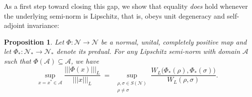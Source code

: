 \documentclass[11pt,reqno]{amsart}
\numberwithin{equation}{section}
\newtheorem{prop}[lemma]{Proposition}
\newcommand{\mc}{\mathcal}
\begin{document}
As a first step toward closing this gap, we show that equality \emph{does} hold whenever the underlying semi-norm is Lipschitz, that is, obeys unit degeneracy and self-adjoint invariance:
\begin{prop}\label{prop:duality}
  \label{thm:Lip=contr}
  Let $\Phi\!:\mc N \!\to\! \mc N$ be a normal, unital, completely positive map and let $\Phi_*:\mc N_*\!\to\! \mc N_*$ denote its predual. For any Lipschitz semi-norm with domain $\mc A$ such that  $\Phi(\mc A) \subseteq \mc A$, we have
  \[
      \sup_{x=x^{*}\in\mc A}\frac{|||\Phi(x)|||_{L}}{|||x|||_{L}}
      \;=\;
      \sup_{\substack{\rho,\sigma\in S(\mc N)\\\rho\neq\sigma}}
      \frac{W_{L}\bigl(\Phi_*(\rho),\Phi_*(\sigma)\bigr)}
           {W_{L}(\rho,\sigma)}.
  \]
\end{prop}
\end{document}
